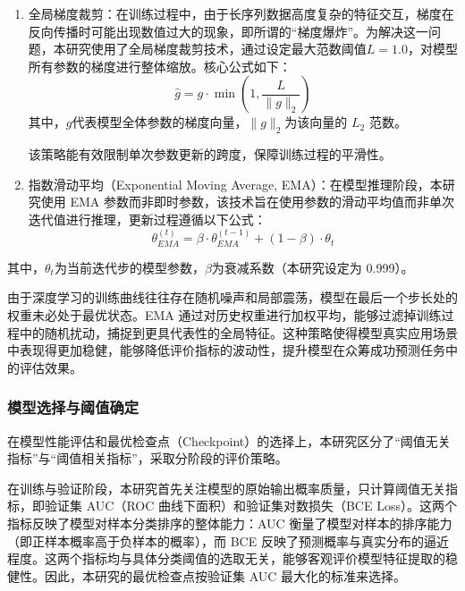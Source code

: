 \begin{enumerate}[label=(\arabic*)]
  \item 全局梯度裁剪：在训练过程中，由于长序列数据高度复杂的特征交互，梯度在反向传播时可能出现数值过大的现象，即所谓的“梯度爆炸”。为解决这一问题，本研究使用了全局梯度裁剪技术，通过设定最大范数阈值$ L=1.0 $，对模型所有参数的梯度进行整体缩放。核心公式如下：
  \begin{equation}
  \hat{g} = g \cdot \min \left( 1, \frac{L}{\|g\|_2} \right)
  \end{equation}
  其中，$ g $代表模型全体参数的梯度向量，$ \|g\|_2 $为该向量的 $ L_2 $ 范数。

  该策略能有效限制单次参数更新的跨度，保障训练过程的平滑性。

  \item 指数滑动平均（Exponential Moving Average, EMA）：在模型推理阶段，本研究使用 EMA 参数而非即时参数，该技术旨在使用参数的滑动平均值而非单次迭代值进行推理，更新过程遵循以下公式：
  \begin{equation}
  \theta_{EMA}^{(t)} = \beta \cdot \theta_{EMA}^{(t-1)} + (1 - \beta) \cdot \theta_t
  \end{equation}
\end{enumerate}


其中，$ \theta_t $为当前迭代步的模型参数，$ \beta $为衰减系数（本研究设定为 0.999）。

由于深度学习的训练曲线往往存在随机噪声和局部震荡，模型在最后一个步长处的权重未必处于最优状态。EMA 通过对历史权重进行加权平均，能够过滤掉训练过程中的随机扰动，捕捉到更具代表性的全局特征。这种策略使得模型真实应用场景中表现得更加稳健，能够降低评价指标的波动性，提升模型在众筹成功预测任务中的评估效果。

\subsubsection{模型选择与阈值确定}
在模型性能评估和最优检查点（Checkpoint）的选择上，本研究区分了“阈值无关指标”与“阈值相关指标”，采取分阶段的评价策略。

在训练与验证阶段，本研究首先关注模型的原始输出概率质量，只计算阈值无关指标，即验证集 AUC（ROC 曲线下面积）和验证集对数损失（BCE Loss）。这两个指标反映了模型对样本分类排序的整体能力：AUC 衡量了模型对样本的排序能力（即正样本概率高于负样本的概率），而 BCE 反映了预测概率与真实分布的逼近程度。这两个指标均与具体分类阈值的选取无关，能够客观评价模型特征提取的稳健性。因此，本研究的最优检查点按验证集 AUC 最大化的标准来选择。

